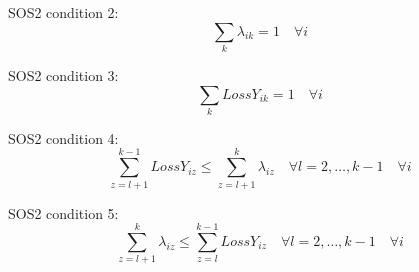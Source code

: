\documentclass{article}
\begin{document}
SOS2 condition 2:
\begin{equation}
	\sum\limits_{k} \lambda_{ik} = 1 \quad \forall i
\end{equation}

SOS2 condition 3:
\begin{equation}
	\sum\limits_{k} LossY_{ik} = 1 \quad \forall i
\end{equation}



SOS2 condition 4:
\begin{equation}
	\sum\limits_{z=l+1}^{k-1} LossY_{iz} \leq \sum\limits_{z=l+1}^{k} \lambda_{iz} \quad \forall l=2,\ldots,k-1 \quad \forall i
\end{equation}

%

SOS2 condition 5:
\begin{equation}
\sum\limits_{z=l+1}^{k} \lambda_{iz} \leq \sum\limits_{z=l}^{k-1} LossY_{iz} \quad \forall l=2,\ldots,k-1 \quad \forall i
\end{equation}

%
\end{document}
